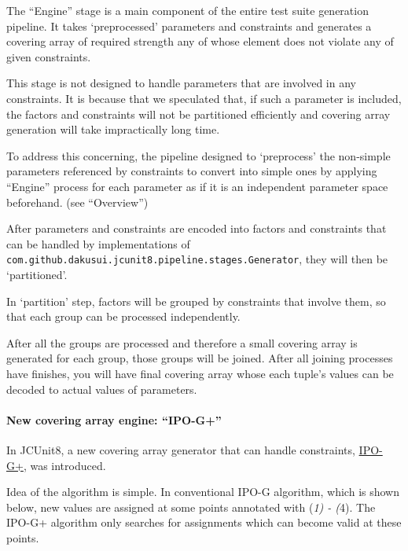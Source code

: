 The ``Engine'' stage is a main component of the entire test suite
generation pipeline. It takes `preprocessed' parameters and constraints
and generates a covering array of required strength any of whose element
does not violate any of given constraints.

This stage is not designed to handle parameters that are involved in any
constraints. It is because that we speculated that, if such a parameter
is included, the factors and constraints will not be partitioned
efficiently and covering array generation will take impractically long
time.

To address this concerning, the pipeline designed to `preprocess' the
non-simple parameters referenced by constraints to convert into simple
ones by applying ``Engine'' process for each parameter as if it is an
independent parameter space beforehand. (see ``Overview'')

After parameters and constraints are encoded into factors and
constraints that can be handled by implementations of
\texttt{com.github.dakusui.jcunit8.pipeline.stages.Generator}, they will
then be `partitioned'.

In `partition' step, factors will be grouped by constraints that involve
them, so that each group can be processed independently.

After all the groups are processed and therefore a small covering array
is generated for each group, those groups will be joined. After all
joining processes have finishes, you will have final covering array
whose each tuple's values can be decoded to actual values of parameters.

\paragraph{\texorpdfstring{New covering array engine:
``IPO-G+''}{New covering array engine: IPO-G+}}\label{new-covering-array-engine-ipo-g}

In JCUnit8, a new covering array generator that can handle constraints,
\href{main/java/com/github/dakusui/jcunit8/pipeline/stages/generators/IpoG.java}{IPO-G+},
was introduced.

Idea of the algorithm is simple. In conventional IPO-G algorithm, which
is shown below, new values are assigned at some points annotated with
(\emph{1) - (}4). The IPO-G+ algorithm only searches for assignments
which can become valid at these points.

